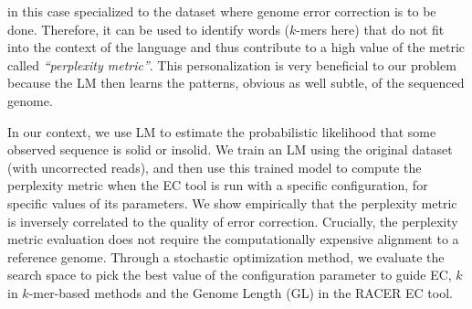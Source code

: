 in this case specialized to the dataset where genome error correction is to be done. 
Therefore, it can be used to identify words ($k$-mers here) that do not fit into the context of the language and thus contribute to a high value of the metric called {\em ``perplexity metric''}. This personalization is very beneficial to our problem because the LM then learns the patterns, obvious as well subtle, of the sequenced genome.

In our context, we use LM to estimate the probabilistic likelihood that some observed sequence is solid or insolid. We train an LM using the original dataset (with uncorrected reads), and then use this trained model to compute the perplexity metric when the EC tool is run with a specific configuration, \ie for specific values of its parameters. 
We show empirically that the perplexity metric is inversely correlated to the quality of error correction.
Crucially, the perplexity metric evaluation does not require the computationally expensive alignment to a reference genome.
Through a stochastic optimization method, we evaluate the search space to pick the best value of the configuration parameter to guide EC, \eg $k$ in $k$-mer-based methods and the Genome Length (GL) in the RACER EC tool. 

